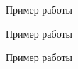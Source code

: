 \documentclass[14pt, a4paper]{extarticle}
\begin{document}
	\begin{figure}[h!]
		\caption{Пример работы}
	\end{figure}

	\begin{figure}[h!]
		\caption{Пример работы}
	\end{figure}

	\begin{figure}[h!]
		\caption{Пример работы}
	\end{figure}
\end{document}
